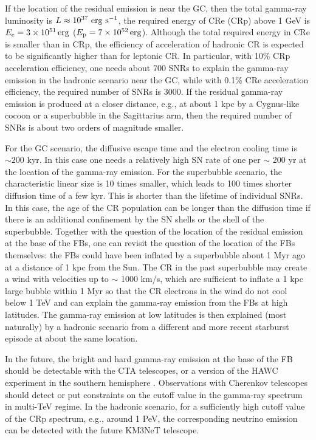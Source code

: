 If the location of the residual emission is near the GC,
then the total gamma-ray luminosity is $L \approx 10^{37}\ {\rm erg\ s^{-1}}$,
the required energy of CRe (CRp) above 1 GeV is $E_{\rm e} = \SI{3e51}{erg}$
($E_{\rm p} = \SI{7e52}{erg}$).
Although the total required energy in CRe is smaller than in CRp,
the efficiency of acceleration of hadronic CR is expected to be significantly higher than for leptonic CR.
In particular, with 10\% CRp acceleration efficiency, one needs about 700 SNRs to explain the 
gamma-ray emission in the hadronic scenario near the GC,
while with 0.1\% CRe acceleration efficiency, the required number of SNRs is 3000.
If the residual gamma-ray emission is produced at a closer distance, e.g., at about 1 kpc
by a Cygnus-like cocoon or a superbubble in the Sagittarius arm, 
then the required number of SNRs is about two orders of magnitude smaller.

For the GC scenario, the diffusive escape time and the electron cooling time is $\sim 200$ kyr.
In this case one needs a relatively high SN rate of one per $\sim$ 200 yr at the location of the gamma-ray emission.
For the superbubble scenario, the characteristic linear size is 10 times smaller, which leads to 100 times shorter
diffusion time of a few kyr. This is shorter than the lifetime of individual SNRs.
In this case, the age of the CR population can be longer than the diffusion time if there is an
additional confinement by the SN shells or the shell of the superbubble.
Together with the question of the location of the residual emission at the base of the FBs,
one can revisit the question of the location of the FBs themselves:
the FBs could have been inflated by a superbubble about 1 Myr ago
at a distance of 1 kpc from the Sun.
The CR in the past superbubble may create a wind with velocities up to $\sim$ 1000 km/s, 
which are sufficient to inflate a 1 kpc large bubble within 1 Myr
so that the CR electrons in the wind do not cool below 1 TeV and can explain the
gamma-ray emission from the FBs at high latitudes.
The gamma-ray emission at low latitudes is then explained (most naturally) by a hadronic
scenario from a different and more recent starburst episode at about the same location.

In the future, the bright and hard gamma-ray emission at the base of the FB
should be detectable with the CTA telescopes, or a version of the HAWC experiment in the southern hemisphere 
\citep{2017APS..APR.R4005M, 2017arXiv170909624A}.
Observations with Cherenkov telescopes should detect or put constraints on the cutoff value in the gamma-ray spectrum in multi-TeV regime.
In the hadronic scenario, for a sufficiently high cutoff value of the CRp spectrum, e.g., around 1 PeV,
the corresponding neutrino emission can be detected with the future KM3NeT telescope.


